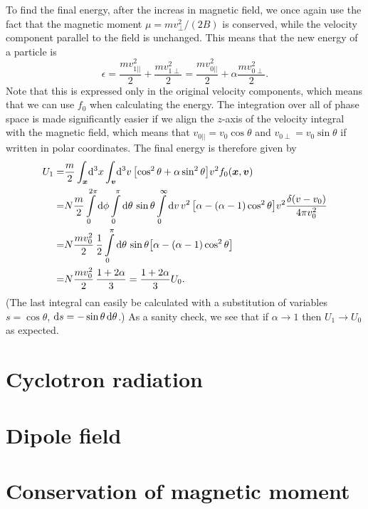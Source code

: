 \documentclass[11pt,a4paper, 
swedish, english %
]{article}
\begin{document}
To find the final energy, after the increas in magnetic field, we once
again use the fact that the magnetic moment  $\mu=mv_\perp^2/(2B)$ is
conserved, while the velocity component parallel to the field is
unchanged. This means that the new energy of a particle is 
\begin{equation}
\epsilon = \frac{mv_{1||}^2}{2}+\frac{mv_{1\perp}^2}{2}
=\frac{mv_{0||}^2}{2}+\alpha\frac{mv_{0\perp}^2}{2}.
\end{equation}
Note that this is expressed only in the original velocity components,
which means that we can use $f_0$ when calculating the energy. 
The integration over all of phase space is made significantly easier
if we align the $z$-axis of the velocity integral with the magnetic
field, which means that $v_{0||}=v_0\cos\theta$ and
$v_{0\perp}=v_0\sin\theta$ if written in polar coordinates. 
The final energy is therefore given by
\begin{equation}
\begin{aligned}
U_1 =& \frac{m}{2}\oldint_{\vb*x}\!\rd^3x \oldint_{\vb*v}\!\rd^3v \,
\qty[\cos^2\theta + \alpha\sin^2\theta] v^2 f_0(\vb*x, \vb*v)\\
=&N\frac{m}{2}
\int_0^{2\pi}\rd\phi\int_0^\pi\rd\theta\,\sin\theta
\int_0^\infty \rd{v}\, v^2\,
\qty[\alpha - (\alpha-1)\cos^2\theta] v^2\frac{\delta(v-v_0)}{4\pi v_0^2}\\
=&N\frac{mv_0^2}{2}\,\frac{1}{2}
\int_0^\pi\rd\theta\,\sin\theta
\qty[\alpha - (\alpha-1)\cos^2\theta]\\
=&N\frac{mv_0^2}{2}\,\frac{1+2\alpha}{3}
=\frac{1+2\alpha}{3}U_0.
\end{aligned}
\end{equation}
(The last integral can easily be calculated with a substitution of
variables $s=\cos\theta$, $\mathrm{d}{s}=-\sin\theta\,\mathrm{d}\theta$.) As a
sanity check, we see that if $\alpha\to1$ then $U_1\to U_0$ as
expected. 



\section{Cyclotron radiation}


\section{Dipole field}


\section{Conservation of magnetic moment}




\end{document}
